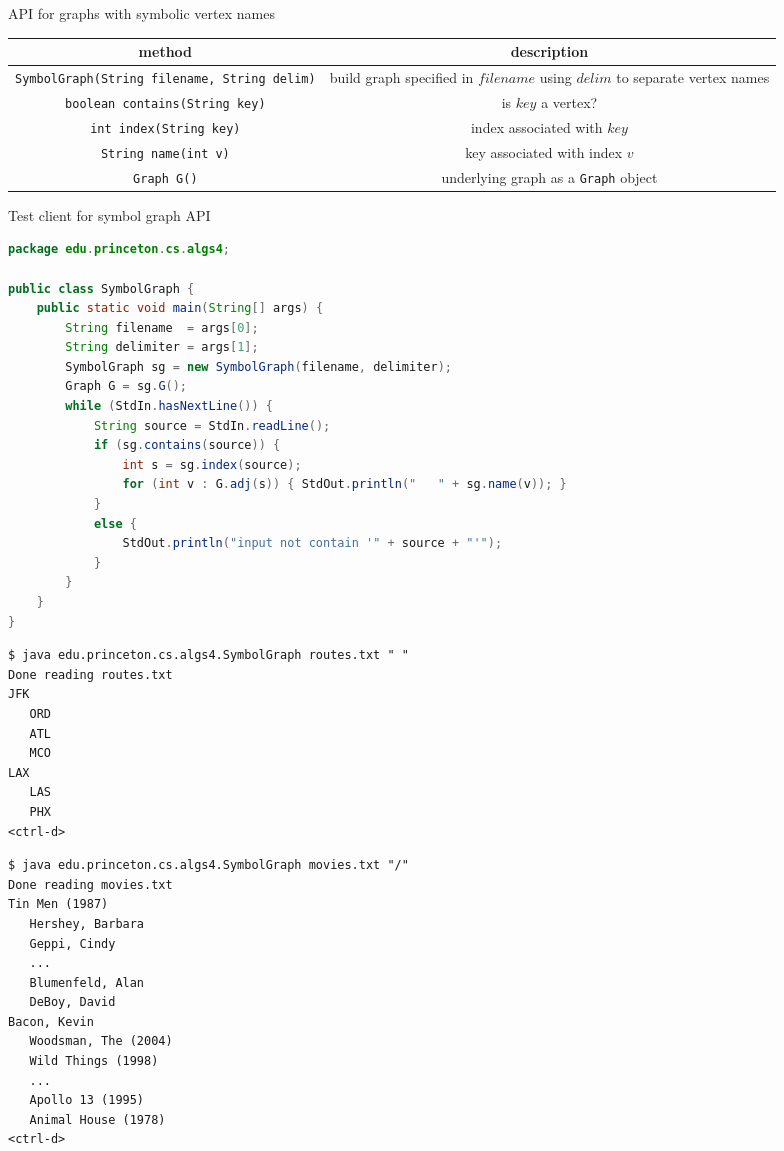 \documentclass[8pt,a4paper,compress]{beamer}
\begin{document}
\begin{frame}[fragile]
\pause

API for graphs with symbolic vertex names
\begin{center}
\begin{tabular}{cc}
method & description \\ \hline
\lstinline$SymbolGraph(String filename, String delim)$ & \makecell{build graph specified in $filename$ \\ using $delim$ to separate vertex names} \\
\lstinline$boolean contains(String key)$ & is $key$ a vertex? \\
\lstinline$int index(String key)$ & index associated with $key$ \\
\lstinline$String name(int v)$ & key associated with index $v$ \\
\lstinline$Graph G()$ & underlying graph as a \lstinline$Graph$ object
\end{tabular} 
\end{center}

\pause
\bigskip

Test client for symbol graph API
\begin{lstlisting}[language=Java]
package edu.princeton.cs.algs4;

public class SymbolGraph {
    public static void main(String[] args) {
        String filename  = args[0];
        String delimiter = args[1];
        SymbolGraph sg = new SymbolGraph(filename, delimiter);
        Graph G = sg.G();
        while (StdIn.hasNextLine()) {
            String source = StdIn.readLine();
            if (sg.contains(source)) {
                int s = sg.index(source);
                for (int v : G.adj(s)) { StdOut.println("   " + sg.name(v)); }
            }
            else {
                StdOut.println("input not contain '" + source + "'");
            }
        }
    }
}
\end{lstlisting}
\end{frame}

\begin{frame}[fragile]
\pause

\begin{lstlisting}[language={}]
$ java edu.princeton.cs.algs4.SymbolGraph routes.txt " "
Done reading routes.txt
JFK
   ORD
   ATL
   MCO
LAX
   LAS
   PHX
<ctrl-d>
\end{lstlisting}

\pause

\begin{lstlisting}[language={}]
$ java edu.princeton.cs.algs4.SymbolGraph movies.txt "/"
Done reading movies.txt
Tin Men (1987)
   Hershey, Barbara
   Geppi, Cindy
   ...
   Blumenfeld, Alan
   DeBoy, David
Bacon, Kevin
   Woodsman, The (2004)
   Wild Things (1998)
   ...
   Apollo 13 (1995)
   Animal House (1978)
<ctrl-d>
\end{lstlisting}
\end{frame}
\end{document}
